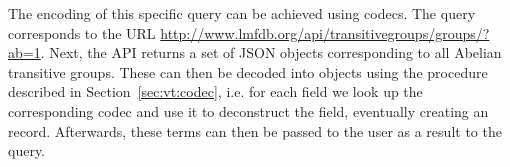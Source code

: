 The encoding of this specific query can be achieved using codecs.
The query corresponds to the URL \url{http://www.lmfdb.org/api/transitivegroups/groups/?ab=1}. 
Next, the \lmfdb API returns a set of JSON objects corresponding to all Abelian transitive groups. 
These can then be decoded into \ommt objects using the procedure described in Section~\ref{sec:vt:codec}, i.e. for each field we look up the corresponding codec and use it to deconstruct the field, eventually creating an \mmt record. 
Afterwards, these \ommt terms can then be passed to the user as a result to the query. 




